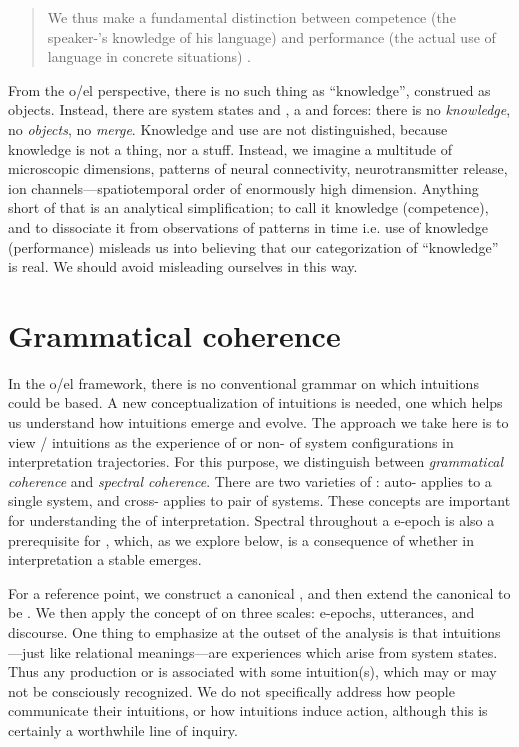 \begin{quote}
We thus make a fundamental distinction between competence (the speaker-'s knowledge of his language) and performance (the actual use of language in concrete situations) \citep[4]{Chomsky1965}.
\end{quote}


  From the o/el perspective, there is no such thing as “knowledge”, construed as objects. Instead, there are system states and , a  and forces: there is no \textit{knowledge}, no \textit{objects}, no \textit{merge}. Knowledge and use are not distinguished, because knowledge is not a thing, nor a stuff. Instead, we imagine a multitude of microscopic dimensions, patterns of neural connectivity, neurotransmitter release, ion channels—spatiotemporal order of enormously high dimension. Anything short of that is an analytical simplification; to call it knowledge (competence), and to dissociate it from observations of patterns in time i.e. use of knowledge (performance) misleads us into believing that our categorization of “knowledge” is real. We should avoid misleading ourselves in this way.

\section{Grammatical coherence}

In the o/el framework, there is no conventional grammar on which  intuitions could be based. A new conceptualization of intuitions is needed, one which helps us understand how intuitions emerge and evolve. The approach we take here is to view / intuitions as the experience of  or non- of system configurations in interpretation trajectories. For this purpose, we distinguish between \textit{grammatical coherence} and \textit{spectral coherence}. There are two varieties of : auto- applies to a single system, and cross- applies to pair of systems. These concepts are important for understanding the  of interpretation. Spectral  throughout a e-epoch is also a prerequisite for , which, as we explore below, is a consequence of whether in interpretation a stable  emerges.

For a reference point, we construct a canonical , and then extend the canonical  to be . We then apply the concept of  on three scales: e-epochs, utterances, and discourse. One thing to emphasize at the outset of the analysis is that intuitions—just like relational meanings—are experiences which arise from system states. Thus any production or  is associated with some intuition(s), which may or may not be consciously recognized. We do not specifically address how people communicate their intuitions, or how intuitions induce action, although this is certainly a worthwhile line of inquiry.


